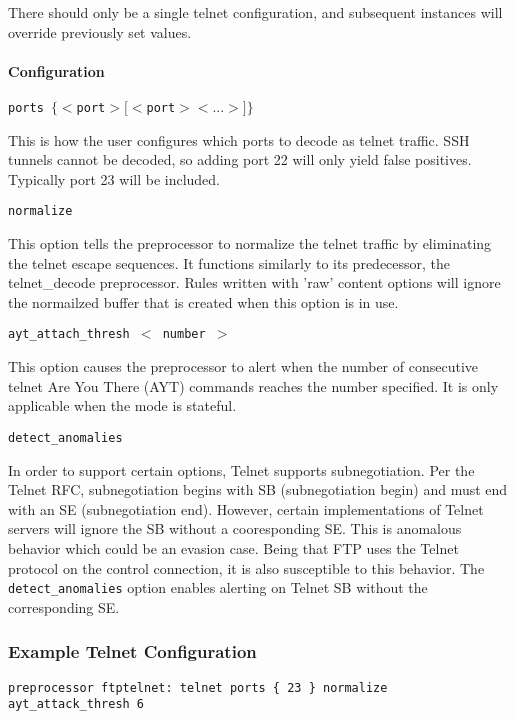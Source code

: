\documentclass[english]{report}
\newcounter{slistnum}
\newenvironment{slist}
{ \begin{list}{ {\bf \arabic{slistnum}.} }{\usecounter{slistnum} } }
{ \end{list} }
\begin{document}
There should  only be a single telnet configuration, and subsequent instances
will override previously set values.

\paragraph{Configuration}
\begin{slist}
\item \texttt{ports $\{ <$port$> [<$port$> <...>] \}$}

This is how the user configures which ports to decode as telnet traffic.
SSH tunnels cannot be decoded, so adding port 22 will only yield false
positives.  Typically port 23 will be included.

\item \texttt{normalize}

This option tells the preprocessor to normalize the telnet traffic
by eliminating the telnet escape sequences.  It functions similarly
to its predecessor, the telnet\_decode preprocessor.  Rules written
with 'raw' content options will ignore the normailzed buffer that
is created when this option is in use.

\item \texttt{ayt\_attach\_thresh $<$ number $>$}

This option causes the preprocessor to alert when the number of consecutive
telnet Are You There (AYT) commands reaches the number specified.  It
is only applicable when the mode is stateful.

\item \texttt{detect\_anomalies}

In order to support certain options, Telnet supports subnegotiation. Per the
Telnet RFC, subnegotiation begins with SB (subnegotiation begin) and must
end with an SE (subnegotiation end). However, certain implementations of
Telnet servers will ignore the SB without a cooresponding SE. This is
anomalous behavior which could be an evasion case. Being that FTP uses the
Telnet protocol on the control connection, it is also susceptible to this
behavior. The \texttt{detect\_anomalies} option enables alerting on Telnet SB without
the corresponding SE.

\end{slist}

\subsubsection{Example Telnet Configuration}
\begin{verbatim}
preprocessor ftptelnet: telnet ports { 23 } normalize ayt_attack_thresh 6
\end{verbatim}
\end{document}
